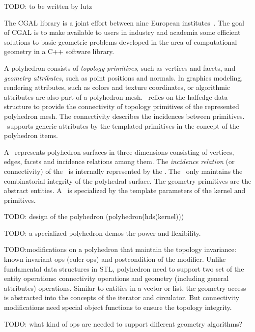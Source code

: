 TODO: to be written by lutz

The CGAL library is a joint effort between nine European
institutes~\cite{fgkss-dccga-00}. The goal of CGAL is to make
available to users in industry and academia some efficient solutions
to basic geometric problems developed in the area of computational
geometry in a C++ software library.

A polyhedron consists of \emph{topology primitives}, 
such as vertices and facets, and \emph{geometry attributes}, 
such as point positions and normals. 
In graphics modeling, rendering attributes, 
such as colors and texture coordinates, or algorithmic 
attributes are also part of a polyhedron mesh.
\cgalpoly\ relies on the halfedge data 
structure \cite{hds} to provide the connectivity of 
topology primitives of the represented polyhedron mesh. 
The connectivity describes the incidences between 
primitives. \poly\ supports generic attributes 
by the templated primitives in the concept of the polyhedron
items.

A \cgalpoly\ represents polyhedron surfaces in three dimensions
consisting of vertices, edges, facets and incidence relations among them.
The \emph{incidence relation} (or connectivity) of the \poly\ is
internally represented by the \cgalhds . 
The \poly\ only maintains the combinatorial integrity of the 
polyhedral surface. The geometry primitives are the abstract 
entities. A \poly\ is specialized by the
template parameters of the kernel and primitives.

TODO: design of the polyhedron (polyhedron(hds(kernel)))

TODO: a specialized polyhedron demos the power and flexibility.

TODO:modifications on a polyhedron that maintain the topology invariance:
known invariant ops (euler ops) and postcondition of the modifier. Unlike
fundamental data structures in STL, polyhedron need to support two
set of the entity operations: connectivity operations and geometry 
(including general attributes) operations. Similar to 
entities in a vector or list, the geometry access is
abstracted into the concepts of the iterator and circulator.
But connectivity modifications need special object functions
to ensure the topology integrity.

TODO: what kind of ops are needed to support different geometry algorithms?

